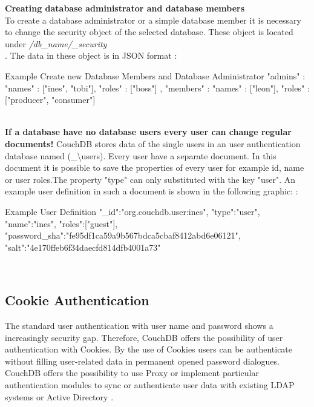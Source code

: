 \textbf{Creating database administrator and database members}
\\
To create a database administrator or a simple database member it is necessary to change the security object of the selected database. These object is located under \textit{\slash db\_name\slash\_security} \\ \parencite{ApacheSoftwareFoundation.2013.SecurityFeatures}.
The data in these object is in JSON format \parencite{ApacheSoftwareFoundation.2013.SecurityFeatures}:
\begin{mylisting}{Example Create new Database Members and Database Administrator \parencite{ApacheSoftwareFoundation.2013.SecurityFeatures}}
{
  "admins" : {
     "names" : ["ines", "tobi"],
     "roles" : ["boss"]
   },
   "members" : {
     "names" : ["leon"],
     "roles" : ["producer", "consumer"]
   }
}
\end{mylisting}
\\
\textbf{If a database have no database users every user can change regular documents!}
CouchDB stores data of the single users in an user authentication database named (\_\textbackslash users). Every user have a separate document. In this document it is possible to save the properties of every user for example id, name or user roles.The property "type" can only substituted with the key "user". An example user definition in such a document is shown in the following graphic: \parencite{ApacheSoftwareFoundation.2013.SecurityFeatures}:
\begin{mylisting}{Example User Definition \parencite{ApacheSoftwareFoundation.2013.SecurityFeatures}}
{
 "_id":"org.couchdb.user:ines",
 "type":"user",
 "name":"ines",
 "roles":["guest"],
 "password_sha":"fe95df1ca59a9b567bdca5cbaf8412abd6e06121",
 "salt":"4e170ffeb6f34daecfd814dfb4001a73"
}
\end{mylisting} \\

\subsection{Cookie Authentication}
The standard user authentication with user name and password shows a increasingly security gap. Therefore, CouchDB offers the possibility of user authentication with Cookies. By the use of Cookies users can be authenticate without filling user-related data in permanent opened password dialogues. 
CouchDB offers the possibility to use Proxy or implement particular authentication modules to sync or authenticate user data with existing LDAP systems or Active Directory \parencite{Anderson.2010.Buch}.

